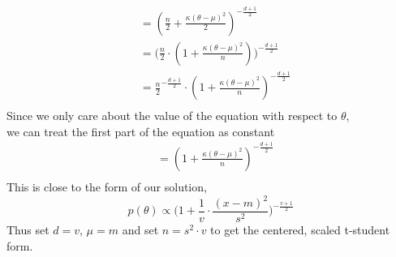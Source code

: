 \documentclass{homework}
\begin{document}
\begin{enumerate}[label=(\Alph*)]
\begin{equation}
\begin{split}
& = ( \frac{n}{2} + \frac{\kappa(\theta - \mu)^2}{2} )^{-\frac{d+1}{2}} \\
& = \big(\frac{n}{2} \cdot ( 1 + \frac{\kappa(\theta - \mu)^2}{n}) \big)^{-\frac{d+1}{2}} \\
& = \frac{n}{2}^{-\frac{d+1}{2}} \cdot ( 1 + \frac{\kappa(\theta - \mu)^2}{n})^{-\frac{d+1}{2}} \\
\end{split} \end{equation}
Since we only care about the value of the equation with respect to $\theta$, \\we can treat the first part of the equation as constant
\begin{equation} \begin{split}
& = ( 1 + \frac{\kappa(\theta - \mu)^2}{n})^{-\frac{d+1}{2}} \\
\end{split} \end{equation}
This is close to the form of our solution, $$p(\theta) \propto \big( 1 + \frac{1}{v} \cdot \frac{(x-m)^2}{s^2}\big)^{-\frac{v+1}{2}}$$
Thus set $d = v$, $\mu = m$ and set $n = s^2 \cdot v$ to get the centered, scaled t-student form.


\end{enumerate}
\end{document}
